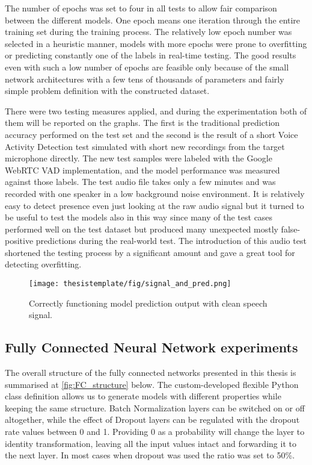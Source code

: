 The number of epochs was set to four in all tests to allow fair comparison between the different models. One epoch means one iteration through the entire training set during the training process. The relatively low epoch number was selected in a heuristic manner, models with more epochs were prone to overfitting or predicting constantly one of the labels in real-time testing. The good results even with such a low number of epochs are feasible only because of the small network architectures with a few tens of thousands of parameters and fairly simple problem definition with the constructed dataset.

There were two testing measures applied, and during the experimentation both of them will be reported on the graphs. The first is the traditional prediction accuracy performed on the test set and the second is the result of a short Voice Activity Detection test simulated with short new recordings from the target microphone directly. The new test samples were labeled with the Google WebRTC VAD implementation, and the model performance was measured against those labels. The test audio file takes only a few minutes and was recorded with one speaker in a low background noise environment. It is relatively easy to detect presence even just looking at the raw audio signal but it turned to be useful to test the models also in this way since many of the test cases performed well on the test dataset but produced many unexpected mostly false-positive predictions during the real-world test. The introduction of this audio test shortened the testing process by a significant amount and gave a great tool for detecting overfitting.

\begin{figure}[ht]
  \begin{center}
    \texttt{[image: thesistemplate/fig/signal\_and\_pred.png]}
    \caption{Correctly functioning model prediction output with clean speech signal.}
    \label{fig:wave_and_pred}
  \end{center}
\end{figure}



\subsection{Fully Connected Neural Network experiments}

The overall structure of the fully connected networks presented in this thesis is summarised at \autoref{fig:FC_structure} below. The custom-developed flexible Python class definition allows us to generate models with different properties while keeping the same structure. Batch Normalization layers can be switched on or off altogether, while the effect of Dropout layers can be regulated with the dropout rate values between 0 and 1. Providing 0 as a probability will change the layer to identity transformation, leaving all the input values intact and forwarding it to the next layer. In most cases when dropout was used the ratio was set to 50\%.

